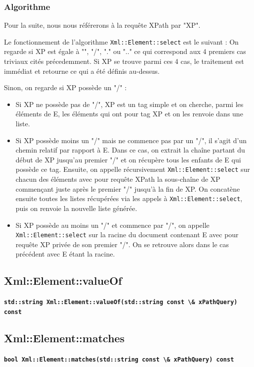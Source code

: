     \subsubsection{Algorithme}

    Pour la suite, nous nous référerons à la requête XPath par "XP".

    Le fonctionnement de l'algorithme \lstinline$Xml::Element::select$ est le suivant :
    On regarde si XP est égale à "", "/", "." ou ".." ce qui correspond aux 4 premiers cas triviaux cités précedemment.
    Si XP se trouve parmi ces 4 cas, le traitement est immédiat et retourne ce qui a été définis au-dessus.

    Sinon, on regarde si XP possède un "/" :
    \begin{itemize}
        \item Si XP ne possède pas de "/", XP est un tag simple et on cherche, parmi les éléments de E, les éléments qui ont pour tag XP et on les renvoie dans une liste.
        \item Si XP possède moins un "/" mais ne commence pas par un "/", il s'agit d'un chemin relatif par rapport à E. Dans ce cas, on extrait la chaîne partant du début de XP jusqu'au premier "/" et on récupère tous les enfants de E qui possède ce tag. Ensuite, on appelle récursivement \lstinline$Xml::Element::select$ sur chacun des éléments avec pour requête XPath la sous-chaîne de XP commençant juste après le premier "/" jusqu'à la fin de XP. On concatène ensuite toutes les listes récupérées via les appels à \lstinline$Xml::Element::select$, puis on renvoie la nouvelle liste générée.
        \item Si XP possède au moins un "/" et commence par "/", on appelle \lstinline$Xml::Element::select$ sur la racine du document contenant E avec pour requête XP privée de son premier "/". On se retrouve alors dans le cas précédent avec E étant la racine.
    \end{itemize}

    \subsection{Xml::Element::valueOf}

    \textbf{\lstinline$std::string Xml::Element::valueOf(std::string const \& xPathQuery) const$}

    \subsection{Xml::Element::matches}

    \textbf{\lstinline$bool Xml::Element::matches(std::string const \& xPathQuery) const$}

